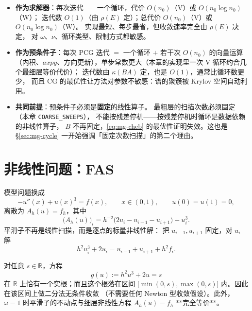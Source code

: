 \begin{remark}
\begin{itemize}
  \item \textbf{作为求解器}：每次迭代 $=$ 一个循环，代价 $O(n_0)$（V）或 $O(n_0\log n_0)$（W）；
        迭代数 $O(1)$（由 $\rho(E)$ 定）；总代价 $O(n_0)$（V）或 $O(n_0\log n_0)$（W）。
        实现最短、每步最省，但收敛速率完全由 $\rho(E)$ 决定，
        对 $\omega$、$\nu$、循环类型、限制方式都敏感。
  \item \textbf{作为预条件子}：每次 PCG 迭代 $=$ 一个循环 $+$ 若干次 $O(n_0)$ 的向量运算
        （内积、$axpy$、方向更新），单步常数更大（本章的实现里一次 V 循环约合几个最细层等价代价）；
        迭代数由 $\kappa(BA)$ 定，也是 $O(1)$，通常比循环数更少，
        而且 CG 的最优性让方法对参数不敏感：谱的聚簇被 Krylov 空间自动利用。
  \item \textbf{共同前提}：预条件子必须是\textbf{固定}的线性算子。
        最粗层的扫描次数必须固定（本章 \texttt{COARSE\_SWEEPS}），
        不能按残差停机——按残差停机时循环是数据依赖的非线性算子，
        $B$ 不再固定，\eqref{eq:mg-cheb} 的最优性证明失效。这也是
        \S\ref{sec:mg-cycle} 一开始强调「固定次数扫描」的第二个理由。
\end{itemize}
\end{remark}

\section{非线性问题：FAS}
\label{sec:mg-fas}

模型问题换成
\begin{equation}
  -u''(x)+u(x)^3=f(x),\qquad x\in(0,1),\qquad u(0)=u(1)=0,
  \label{eq:mg-nl}
\end{equation}
离散为 $A_h(u)=f_h$，其中
\begin{equation}
  \bigl(A_h(u)\bigr)_i=h^{-2}\bigl(2u_i-u_{i-1}-u_{i+1}\bigr)+u_i^3 .
  \label{eq:mg-nl-op}
\end{equation}
平滑子不再是线性扫描，而是逐点的标量非线性解：
把 $u_{i-1},u_{i+1}$ 固定，对 $u_i$ 解
\begin{equation}
  h^2u_i^3+2u_i=u_{i-1}+u_{i+1}+h^2f_i .
  \label{eq:mg-cubic}
\end{equation}

\begin{theorem}
\label{thm:mg-cubic}
对任意 $s\in\mathbb R$，方程
\begin{equation}
  g(u):=h^2u^3+2u=s
  \label{eq:mg-cubic-root}
\end{equation}
在 $\mathbb R$ 上恰有一个实根；而且这个根落在区间
$\bigl[\min(0,s),\max(0,s)\bigr]$ 内。因此在该区间上做二分法无条件收敛
（不需要任何 Newton 型收敛假设）。此外，$\omega=1$ 时平滑子的不动点与细层非线性方程
$A_h(u)=f_h$ **完全等价**。
\end{theorem}

